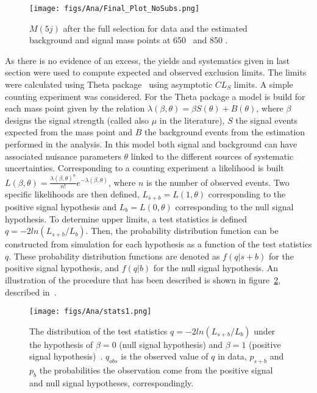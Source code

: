 \begin{figure}[!Hhtbp]
  \begin{center}
    \texttt{[image: figs/Ana/Final\_Plot\_NoSubs.png]}
    \caption{$M(5j)$ after the full selection for data and the estimated background and signal mass points at 650 \GeVcc~and 850 \GeVcc.}
    \label{fig:FinalPlot2}
  \end{center}
\end{figure}

As there is no evidence of an excess, the yields and systematics given in last section were used to compute expected and observed exclusion limits. The limits were calculated using Theta package~\cite{theta_web} using asymptotic $CL_{S}$ limits. A simple counting experiment was considered. For the Theta package a model is build for each mass point given by the relation ${\lambda(\beta,\theta)=\beta S(\theta)+B(\theta)}$, where $\beta$ designs the signal strength (called also $\mu$ in the literature), $S$ the signal events expected from the mass point and $B$ the background events from the estimation performed in the analysis. In this model both signal and background can have associated nuisance parameters $\theta$ linked to the different sources of systematic uncertainties. Corresponding to a counting experiment a likelihood is built $L(\beta,\theta)=\frac{\lambda(\beta,\theta)^{n}}{n!}e^{-\lambda(\beta,\theta)}$, where $n$ is the number of observed events. Two specific likelihoods are then defined, $L_{s+b}=L(1,\theta)$ corresponding to the positive signal hypothesis and $L_{b}=L(0,\theta)$ corresponding to the null signal hypothesis. To determine upper limits, a test statistics is defined $q=-2ln(L_{s+b}/L_{b})$. Then, the probability distribution function can be constructed from simulation for each hypothesis as a function of the test statistics $q$. These probability distribution functions are denoted as $f(q|s+b)$ for the positive signal hypothesis, and $f(q|b)$ for the null signal hypothesis. An illustration of the procedure that has been described is shown in figure~\ref{fig:stats1}, described in~\cite{stats1}. 

\begin{figure}[!Hhtbp]
  \begin{center}
    \texttt{[image: figs/Ana/stats1.png]}
    \caption{The distribution of the test statistics $q=-2ln(L_{s+b}/L_{b})$ under the hypothesis of $\beta=0$ (null signal hypothesis) and $\beta=1$ (positive signal hypothesis)~\cite{stats1}. $q_{obs}$ is the observed value of $q$ in data, $p_{s+b}$ and $p_{b}$ the probabilities the observation come from the positive signal and null signal hypotheses, correspondingly.}
    \label{fig:stats1}
  \end{center}
\end{figure}

